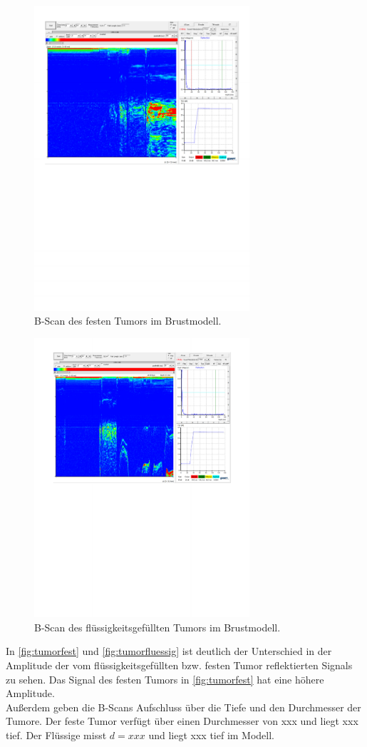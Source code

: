 \begin{figure}[H]
  \centering
  \includegraphics[width = 8cm]{content/festtumor.pdf}
  \caption{B-Scan des festen Tumors im Brustmodell.}
  \label{fig:tumorfest}
\end{figure}
\begin{figure}[H]
  \centering
  \includegraphics[width = 8cm]{content/wassertumor.pdf}
  \caption{B-Scan des flüssigkeitsgefüllten Tumors im Brustmodell.}
  \label{fig:tumorfluessig}
\end{figure}

In \autoref{fig:tumorfest} und \autoref{fig:tumorfluessig} ist deutlich der Unterschied 
in der Amplitude der vom flüssigkeitsgefüllten bzw. festen Tumor reflektierten Signals zu sehen.
Das Signal des festen Tumors in \autoref{fig:tumorfest} hat eine höhere 
Amplitude. \\
Außerdem geben die B-Scans Aufschluss über die Tiefe und den Durchmesser der Tumore.
Der feste Tumor verfügt über einen Durchmesser von xxx und liegt xxx tief.
Der Flüssige misst $d = xxx$ und liegt xxx tief im Modell.
